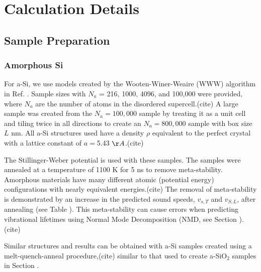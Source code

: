 \documentclass[aps,prb,twocolumn,superscriptaddress,footinbib,amsmath,amssymb,floatfix]{revtex4}
\begin{document}

\section{\label{S:Calculation}Calculation Details}

\subsection{\label{S:Sample}Sample Preparation}

\subsubsection{\label{S:Sample:Si}Amorphous Si}

For a-Si, we use models created by the Wooten-Winer-Weaire (WWW) algorithm in  
Ref. .  Sample sizes with $N_a$ =  
216, 1000, 4096, and 100,000 were provided, where $N_a$ are the number of 
atoms in the disordered supercell.(cite)  
A large sample was created from the $N_a = 100,000$ sample 
by treating it 
as a unit cell and tiling twice in all directions to create an 
$N_a = 800,000$ sample with box size $L$ nm. 
All a-Si structures used have a density $\rho$ equivalent to the perfect 
crystal with a lattice constant of $a=$5.43 $\AA$.(cite) 

The Stillinger-Weber potential is 
used with these samples.  
The samples were annealed at a temperature of 1100 K for 5 ns to remove 
meta-stability. Amorphous materials have many different atomic 
(potential energy) 
configurations with nearly equivalent energies.(cite)  
The removal of meta-stability is demonstrated 
by an increase in the predicted sound speeds, 
$v_{s,T}$ and $v_{S,L}$, after 
annealing (see Table ).  This meta-stability can 
cause errors when predicting vibrational lifetimes using Normal 
Mode Decomposition (NMD, see Section ).(cite) 

Similar structures and results can be obtained with a-Si samples 
created using a melt-quench-anneal procedure,(cite) similar to that 
used to create a-SiO$_2$ samples in Section . 
\end{document}
